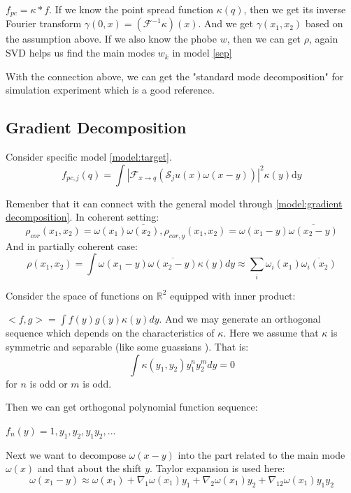 \documentclass{article}
\numberwithin{equation}{section}
\begin{document}
$f_{pc} = \kappa * f $. If we know the point spread function $\kappa(q)$, then we get its inverse Fourier transform $\gamma(0,x) = (\mathcal{F}^{-1}\kappa)(x)$. And we get $\gamma(x_1,x_2)$ based on the assumption above.  If we also know the phobe $w$, then we can get $\rho$, again SVD helps us find the main modes $w_k$ in model \eqref{sep}

With the connection above, we can get the "standard mode decomposition" for simulation experiment which is a good reference.

\subsection{Gradient Decomposition}

Consider specific model \ref{model:target}.
\begin{equation}
f_{p c, j}(q) = \int\left|\mathcal{F}_{x \rightarrow q}\left(\mathcal{S}_{j} u(x) \omega(x-y)\right)\right|^{2} \kappa(y) \mathrm{d} y
\end{equation}

 Remenber that it can connect with the general model through \eqref{model:gradient decomposition}. 
In coherent setting:
$$
\rho_{cor}(x_1,x_2) = \omega(x_1) \overline{\omega(x_2)},
\rho_{cor,y}(x_1,x_2) = \omega(x_1 - y) \overline{\omega(x_2-y)}
$$
And in partially coherent case:
\begin{equation}
 \rho(x_1,x_2) = \int \omega(x_1-y) \overline{\omega(x_2-y)} \kappa(y) dy \approx\sum_i \omega_i(x_1) \overline{\omega_i(x_2)}
\end{equation}

Consider the space of functions on  $\mathbb{R}^2$ equipped with inner product:

$<f,g> = \int f(y)g(y)\kappa(y) dy$.
And we may generate an orthogonal sequence which depends on the characteristics of $\kappa$. Here we assume that $\kappa$ is symmetric and separable (like some guassians ). That is:
$$
 \int \kappa(y_1,y_2) y_1^n y_2 ^m dy =0 
$$ for $n$ is odd or $m$ is odd.
 
Then we can get orthogonal polynomial function sequence:

$f_n(y) = 1,y_1,y_2,y_1y_2, ...$

Next we want to decompose $\omega(x-y)$ into the part related to the main mode $\omega(x)$ and that about the shift $y$. Taylor expansion is used here:
$$
\omega(x_1-y) \approx \omega(x_1) + \nabla_1 \omega(x_1)y_1 + \nabla_2 \omega(x_1)y_2 + \nabla_{12}\omega(x_1) y_1 y_2  
$$
\end{document}
